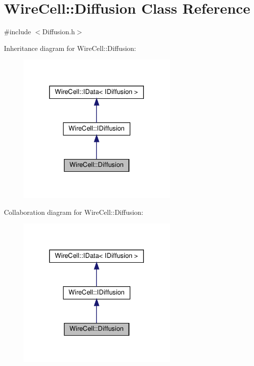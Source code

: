 \hypertarget{class_wire_cell_1_1_diffusion}{}\section{Wire\+Cell\+:\+:Diffusion Class Reference}
\label{class_wire_cell_1_1_diffusion}


{\ttfamily \#include $<$Diffusion.\+h$>$}



Inheritance diagram for Wire\+Cell\+:\+:Diffusion\+:
\nopagebreak
\begin{figure}[H]
\begin{center}
\leavevmode
\includegraphics[width=224pt]{class_wire_cell_1_1_diffusion__inherit__graph}
\end{center}
\end{figure}


Collaboration diagram for Wire\+Cell\+:\+:Diffusion\+:
\nopagebreak
\begin{figure}[H]
\begin{center}
\leavevmode
\includegraphics[width=224pt]{class_wire_cell_1_1_diffusion__coll__graph}
\end{center}
\end{figure}
